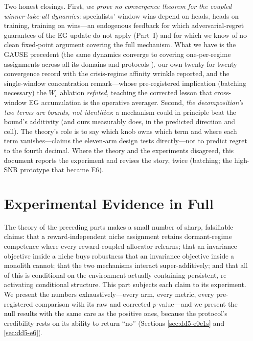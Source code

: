 \documentclass[11pt,a4paper]{article}
\theoremstyle{definition}
\theoremstyle{plain}
\begin{document}
Two honest closings. First, \emph{we prove no convergence theorem for
the coupled winner-take-all dynamics}: specialists' window wins depend on
heads, heads on training, training on wins---an endogenous feedback for
which adversarial-regret guarantees of the EG update do not apply (Part~I)
and for which we know of no clean fixed-point argument covering the full
mechanism. What we have is the GAUSE precedent (the same dynamics
converge to covering one-per-regime assignments across all its domains
and protocols \cite{li2026gause}), our own twenty-for-twenty convergence
record with the crisis-regime affinity wrinkle reported, and the
single-window concentration remark---whose pre-registered implication
(batching necessary) the $W_c$ ablation \emph{refuted}, teaching the
corrected lesson that cross-window EG accumulation is the operative
averager. Second, \emph{the decomposition's two terms are bounds, not
identities}: a mechanism could in principle beat the bound's additivity
(and ours measurably does, in the predicted direction and cell). The
theory's role is to say which knob owns which term and where each term
vanishes---claims the eleven-arm design tests directly---not to predict
regret to the fourth decimal. Where the theory and the experiments
disagreed, this document reports the experiment and revises the story,
twice (batching; the high-SNR prototype that became E6).

\part{Experimental Evidence in Full}
\label{sec:dd5-part}

The theory of the preceding parts makes a small number of sharp, falsifiable
claims: that a reward-independent niche assignment retains dormant-regime
competence where every reward-coupled allocator relearns; that an invariance
objective inside a niche buys robustness that an invariance objective inside a
monolith cannot; that the two mechanisms interact super-additively; and that
all of this is conditional on the environment actually containing persistent,
re-activating conditional structure. This part subjects each claim to its
experiment. We present the numbers exhaustively---every arm, every metric,
every pre-registered comparison with its raw and corrected $p$-value---and we
present the null results with the same care as the positive ones, because the
protocol's credibility rests on its ability to return ``no'' (Sections
\ref{sec:dd5-e0e1s} and \ref{sec:dd5-e6}).
\end{document}

